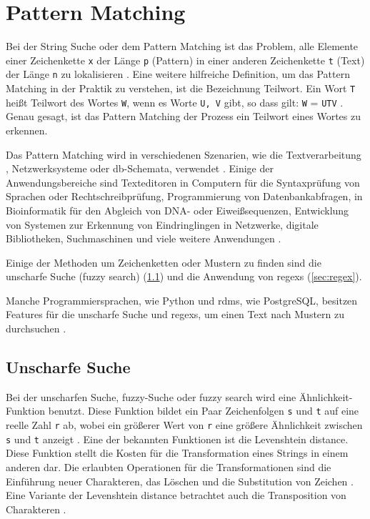 \section{Pattern Matching} \label{subsec:pattmatch}

Bei der String Suche oder dem Pattern Matching ist das Problem, alle Elemente einer Zeichenkette \texttt{x} der Länge \texttt{p} (Pattern) in einer anderen Zeichenkette \texttt{t} (Text) der Länge \texttt{n} zu lokalisieren \cite{patternmatchingapostolico}. Eine weitere hilfreiche Definition, um das Pattern Matching in der Praktik zu verstehen, ist die Bezeichnung \glqq Teilwort\grqq{}. \glqq Ein Wort \texttt{T} heißt Teilwort des Wortes \texttt{W}, wenn es Worte \texttt{U, V} gibt, so dass gilt: \texttt{W} = \texttt{UTV}\grqq{} \cite{teilwort}. Genau gesagt, ist das Pattern Matching der Prozess ein Teilwort eines Wortes zu erkennen.

Das Pattern Matching wird in verschiedenen Szenarien, wie die Textverarbeitung \cite{patternmatchingeffi}, Netzwerksysteme oder \ac{db}-Schemata, verwendet \cite{patternmatchingapps}. Einige der Anwendungsbereiche sind Texteditoren in Computern für die Syntaxprüfung von Sprachen oder Rechtschreibprüfung, Programmierung von Datenbankabfragen, in Bioinformatik für den Abgleich von DNA- oder Eiweißsequenzen, Entwicklung von Systemen zur Erkennung von Eindringlingen in Netzwerke, digitale Bibliotheken, Suchmaschinen und viele weitere Anwendungen \cite{regexconf, patternmatchingapps}.

Einige der Methoden um Zeichenketten oder Mustern zu finden sind die unscharfe Suche (fuzzy search) (\ref{sub:levdist}) und die Anwendung von \acp{regex} (\ref{sec:regex}).

Manche Programmiersprachen, wie Python und \ac{rdms}, wie PostgreSQL, besitzen Features für die unscharfe Suche und \acp{regex}, um einen Text nach Mustern zu durchsuchen \cite{thefuzzlib, patternmatchingpostgres}.

\subsection{Unscharfe Suche} \label{sub:levdist}

Bei der unscharfen Suche, fuzzy-Suche oder fuzzy search wird eine Ähnlichkeit-Funktion benutzt. Diese Funktion bildet ein Paar Zeichenfolgen \texttt{s} und \texttt{t} auf eine reelle Zahl \texttt{r} ab, wobei ein größerer Wert von \texttt{r} eine größere Ähnlichkeit zwischen \texttt{s} und \texttt{t} anzeigt \cite{stringsearch2}. Eine der bekannten Funktionen ist die \glqq Levenshtein distance\grqq{}. Diese Funktion stellt die Kosten für die Transformation eines Strings in einem anderen dar. Die erlaubten Operationen für die Transformationen sind die Einführung neuer Charakteren, das Löschen und die Substitution von Zeichen \cite{stringsearch2}. Eine Variante der \glqq Levenshtein distance\grqq{} betrachtet auch die Transposition von Charakteren \cite{thefuzzyalgo}.

